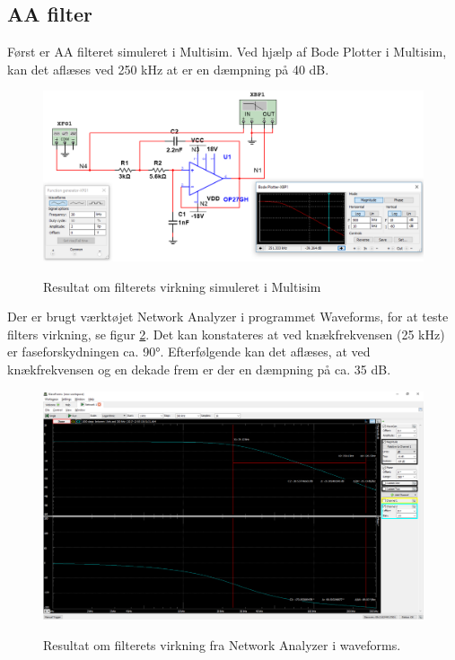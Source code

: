 \subsection{AA filter}

Først er AA filteret simuleret i Multisim. Ved hjælp af Bode Plotter i Multisim, kan det aflæses ved 250 kHz at er en dæmpning på 40 dB.


\begin{figure}[H] 
\centering
{\includegraphics[width=\linewidth]
{Figure/aafilterbodemultisim}}
\caption{Resultat om filterets virkning simuleret i Multisim}
\label{fig:aafilterbodemultisim}
\end{figure}

Der er brugt værktøjet Network Analyzer i programmet Waveforms, for at teste filters virkning, se figur \ref{fig:aafiltermodultest}. Det kan konstateres at ved knækfrekvensen (25 kHz) er faseforskydningen ca. \ang{90}. Efterfølgende kan det aflæses, at ved knækfrekvensen og en dekade frem er der en dæmpning på ca. 35 dB.



\begin{figure}[H] 
\centering
{\includegraphics[width=\linewidth]
{Figure/aafiltermodultest}}
\caption{Resultat om filterets virkning fra Network Analyzer i waveforms.}
\label{fig:aafiltermodultest}
\end{figure}





